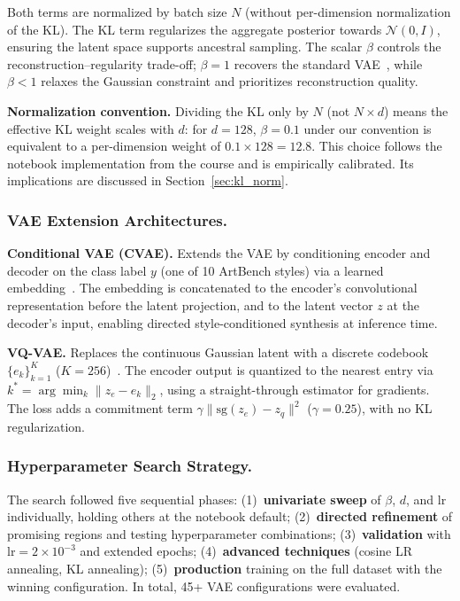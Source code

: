 \documentclass[runningheads]{llncs}
\begin{document}
Both terms are normalized by batch size $N$ (without per-dimension normalization of the KL). The KL term regularizes the aggregate posterior towards $\mathcal{N}(0,I)$, ensuring the latent space supports ancestral sampling. The scalar $\beta$ controls the reconstruction–regularity trade-off; $\beta=1$ recovers the standard VAE~\cite{kingma2013}, while $\beta<1$ relaxes the Gaussian constraint and prioritizes reconstruction quality.

\noindent\textbf{Normalization convention.} Dividing the KL only by $N$ (not $N \times d$) means the effective KL weight scales with $d$: for $d=128$, $\beta=0.1$ under our convention is equivalent to a per-dimension weight of $0.1 \times 128 = 12.8$. This choice follows the notebook implementation from the course and is empirically calibrated. Its implications are discussed in Section~\ref{sec:kl_norm}.

\subsubsection{VAE Extension Architectures.}

\noindent\textbf{Conditional VAE (CVAE).} Extends the VAE by conditioning encoder and decoder on the class label $y$ (one of 10 ArtBench styles) via a learned embedding~\cite{sohn2015}. The embedding is concatenated to the encoder's convolutional representation before the latent projection, and to the latent vector $z$ at the decoder's input, enabling directed style-conditioned synthesis at inference time.

\noindent\textbf{VQ-VAE.} Replaces the continuous Gaussian latent with a discrete codebook $\{e_k\}_{k=1}^{K}$ ($K=256$)~\cite{oord2017}. The encoder output is quantized to the nearest entry via $k^* = \arg\min_k \|z_e - e_k\|_2$, using a straight-through estimator for gradients. The loss adds a commitment term $\gamma\|\mathrm{sg}(z_e) - z_q\|^2$ ($\gamma=0.25$), with no KL regularization.

\subsubsection{Hyperparameter Search Strategy.}\label{sec:vae_search}

The search followed five sequential phases: (1)~\textbf{univariate sweep} of $\beta$, $d$, and lr individually, holding others at the notebook default; (2)~\textbf{directed refinement} of promising regions and testing hyperparameter combinations; (3)~\textbf{validation} with lr$=2{\times}10^{-3}$ and extended epochs; (4)~\textbf{advanced techniques} (cosine LR annealing, KL annealing); (5)~\textbf{production} training on the full dataset with the winning configuration. In total, 45+ VAE configurations were evaluated.
\end{document}
